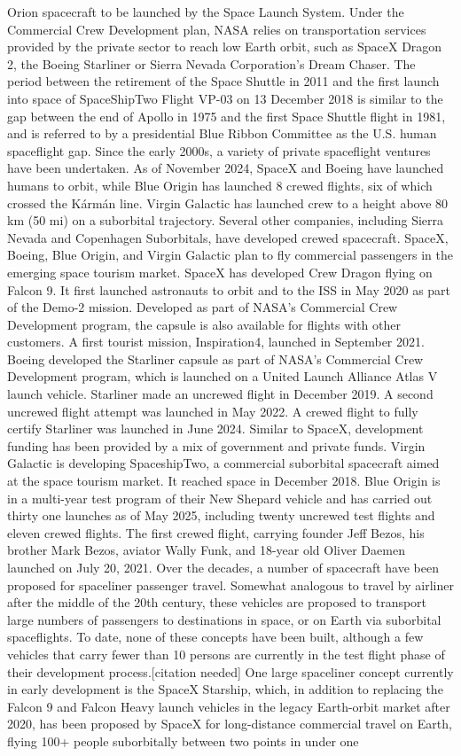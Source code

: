 \documentclass[12pt]{article}
\begin{document}
Orion spacecraft to be launched by the Space Launch System. Under the Commercial Crew Development plan, NASA relies on transportation services provided by the private sector to reach low Earth orbit, such as SpaceX Dragon 2, the Boeing Starliner or Sierra Nevada Corporation's Dream Chaser. The period between the retirement of the Space Shuttle in 2011 and the first launch into space of SpaceShipTwo Flight VP-03 on 13 December 2018 is similar to the gap between the end of Apollo in 1975 and the first Space Shuttle flight in 1981, and is referred to by a presidential Blue Ribbon Committee as the U.S. human spaceflight gap. Since the early 2000s, a variety of private spaceflight ventures have been undertaken. As of November 2024, SpaceX and Boeing have launched humans to orbit, while Blue Origin has launched 8 crewed flights, six of which crossed the Kármán line. Virgin Galactic has launched crew to a height above 80 km (50 mi) on a suborbital trajectory. Several other companies, including Sierra Nevada and Copenhagen Suborbitals, have developed crewed spacecraft. SpaceX, Boeing, Blue Origin, and Virgin Galactic plan to fly commercial passengers in the emerging space tourism market. SpaceX has developed Crew Dragon flying on Falcon 9. It first launched astronauts to orbit and to the ISS in May 2020 as part of the Demo-2 mission. Developed as part of NASA's Commercial Crew Development program, the capsule is also available for flights with other customers. A first tourist mission, Inspiration4, launched in September 2021. Boeing developed the Starliner capsule as part of NASA's Commercial Crew Development program, which is launched on a United Launch Alliance Atlas V launch vehicle. Starliner made an uncrewed flight in December 2019. A second uncrewed flight attempt was launched in May 2022. A crewed flight to fully certify Starliner was launched in June 2024. Similar to SpaceX, development funding has been provided by a mix of government and private funds. Virgin Galactic is developing SpaceshipTwo, a commercial suborbital spacecraft aimed at the space tourism market. It reached space in December 2018. Blue Origin is in a multi-year test program of their New Shepard vehicle and has carried out thirty one launches as of May 2025, including twenty uncrewed test flights and eleven crewed flights. The first crewed flight, carrying founder Jeff Bezos, his brother Mark Bezos, aviator Wally Funk, and 18-year old Oliver Daemen launched on July 20, 2021. Over the decades, a number of spacecraft have been proposed for spaceliner passenger travel. Somewhat analogous to travel by airliner after the middle of the 20th century, these vehicles are proposed to transport large numbers of passengers to destinations in space, or on Earth via suborbital spaceflights. To date, none of these concepts have been built, although a few vehicles that carry fewer than 10 persons are currently in the test flight phase of their development process.[citation needed] One large spaceliner concept currently in early development is the SpaceX Starship, which, in addition to replacing the Falcon 9 and Falcon Heavy launch vehicles in the legacy Earth-orbit market after 2020, has been proposed by SpaceX for long-distance commercial travel on Earth, flying 100+ people suborbitally between two points in under one 
\end{document}
